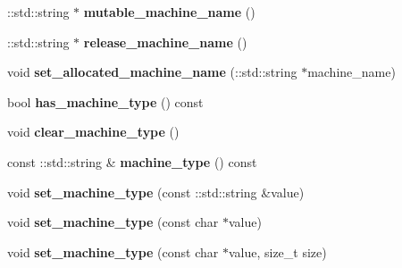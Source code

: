 \begin{DoxyCompactItemize}
\item 
\hypertarget{classmachines_1_1Machine_af84e71b8be6795e3a2ecda67685f34e2}{\-::std\-::string $\ast$ {\bfseries mutable\-\_\-machine\-\_\-name} ()}\label{classmachines_1_1Machine_af84e71b8be6795e3a2ecda67685f34e2}

\item 
\hypertarget{classmachines_1_1Machine_a68724d877a10a12564241866eb7bee0e}{\-::std\-::string $\ast$ {\bfseries release\-\_\-machine\-\_\-name} ()}\label{classmachines_1_1Machine_a68724d877a10a12564241866eb7bee0e}

\item 
\hypertarget{classmachines_1_1Machine_a058e0617b787fc032168436f221d7d04}{void {\bfseries set\-\_\-allocated\-\_\-machine\-\_\-name} (\-::std\-::string $\ast$machine\-\_\-name)}\label{classmachines_1_1Machine_a058e0617b787fc032168436f221d7d04}

\item 
\hypertarget{classmachines_1_1Machine_a56fe7e7b40de92a4f0619a261b454bef}{bool {\bfseries has\-\_\-machine\-\_\-type} () const }\label{classmachines_1_1Machine_a56fe7e7b40de92a4f0619a261b454bef}

\item 
\hypertarget{classmachines_1_1Machine_a09fe1e24adb6566928fec422401c5eeb}{void {\bfseries clear\-\_\-machine\-\_\-type} ()}\label{classmachines_1_1Machine_a09fe1e24adb6566928fec422401c5eeb}

\item 
\hypertarget{classmachines_1_1Machine_a626aba695dc8fa21f7ec4ef40a5b58ef}{const \-::std\-::string \& {\bfseries machine\-\_\-type} () const }\label{classmachines_1_1Machine_a626aba695dc8fa21f7ec4ef40a5b58ef}

\item 
\hypertarget{classmachines_1_1Machine_adb53a730cd688709e67cbff2724f1c02}{void {\bfseries set\-\_\-machine\-\_\-type} (const \-::std\-::string \&value)}\label{classmachines_1_1Machine_adb53a730cd688709e67cbff2724f1c02}

\item 
\hypertarget{classmachines_1_1Machine_adef21321878e4649c8b2326419f1b4fc}{void {\bfseries set\-\_\-machine\-\_\-type} (const char $\ast$value)}\label{classmachines_1_1Machine_adef21321878e4649c8b2326419f1b4fc}

\item 
\hypertarget{classmachines_1_1Machine_a7872ea87aec5e065b583c8778da91ebb}{void {\bfseries set\-\_\-machine\-\_\-type} (const char $\ast$value, size\-\_\-t size)}\label{classmachines_1_1Machine_a7872ea87aec5e065b583c8778da91ebb}


\end{DoxyCompactItemize}
